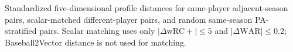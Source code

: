 \caption{Standardized five-dimensional profile distances for same-player adjacent-season pairs, scalar-matched different-player pairs, and random same-season PA-stratified pairs. Scalar matching uses only $|\Delta\mathrm{wRC+}|\leq5$ and $|\Delta\mathrm{WAR}|\leq0.2$; Baseball2Vector distance is not used for matching.}
